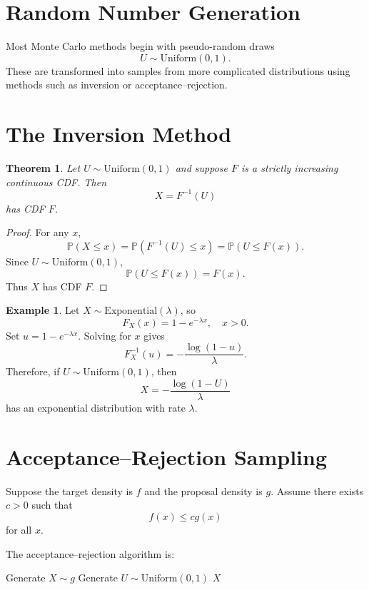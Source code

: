 \documentclass[12pt,oneside]{book}
\numberwithin{equation}{section}
\theoremstyle{definition}
\newtheorem{example}{Example}[section]
\theoremstyle{plain}
\newtheorem{theorem}{Theorem}[section]
\theoremstyle{remark}
\newcommand{\Prob}{\mathbb{P}}
\newcommand{\Exp}{\mathrm{Exponential}}
\begin{document}
\section{Random Number Generation}

Most Monte Carlo methods begin with pseudo-random draws
\[
U\sim \mathrm{Uniform}(0,1).
\]
These are transformed into samples from more complicated distributions using methods such as inversion or acceptance--rejection.

\section{The Inversion Method}

\begin{theorem}
Let $U\sim \mathrm{Uniform}(0,1)$ and suppose $F$ is a strictly increasing continuous CDF. Then
\[
X = F^{-1}(U)
\]
has CDF $F$.
\end{theorem}

\begin{proof}
For any $x$,
\[
\Prob(X\le x)
=
\Prob(F^{-1}(U)\le x)
=
\Prob(U\le F(x)).
\]
Since $U\sim \mathrm{Uniform}(0,1)$,
\[
\Prob(U\le F(x))=F(x).
\]
Thus $X$ has CDF $F$.
\end{proof}

\begin{example}
Let $X\sim \Exp(\lambda)$, so
\[
F_X(x)=1-e^{-\lambda x}, \quad x>0.
\]
Set $u=1-e^{-\lambda x}$. Solving for $x$ gives
\[
F_X^{-1}(u)=-\frac{\log(1-u)}{\lambda}.
\]
Therefore, if $U\sim \mathrm{Uniform}(0,1)$, then
\[
X=-\frac{\log(1-U)}{\lambda}
\]
has an exponential distribution with rate $\lambda$.
\end{example}

\section{Acceptance--Rejection Sampling}

Suppose the target density is $f$ and the proposal density is $g$. Assume there exists $c>0$ such that
\[
f(x)\le c g(x)
\]
for all $x$.

The acceptance--rejection algorithm is:

\begin{algorithm}[H]
\caption{Acceptance--Rejection Sampling}
\begin{algorithmic}[1]
\Repeat
    \State Generate $X\sim g$
    \State Generate $U\sim \mathrm{Uniform}(0,1)$
\State \Return $X$
\end{algorithmic}
\end{algorithm}
\end{document}
